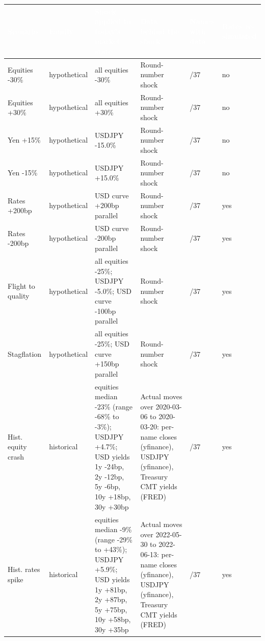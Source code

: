 \documentclass[11pt,letterpaper]{article}
\begin{document}
{\scriptsize\setlength{\LTpre}{4pt}\setlength{\LTpost}{6pt}
\begin{longtable}{>{\raggedright\arraybackslash}p{}>{\raggedright\arraybackslash}p{}>{\raggedright\arraybackslash}p{}>{\raggedright\arraybackslash}p{}>{\raggedright\arraybackslash}p{}>{\raggedright\arraybackslash}p{}}
\toprule
\rowcolor{navy}\textbf{\textcolor{white}{Scenario}} & \textbf{\textcolor{white}{Family}} & \textbf{\textcolor{white}{Shock applied to today's market state}} & \textbf{\textcolor{white}{Data behind the shock}} & \textbf{\textcolor{white}{Names with data}} & \textbf{\textcolor{white}{Rates re-simulated}} \\
\endhead
Equities -30\% & hypothetical & all equities -30\% & Round-number shock & 37/37 & no \\
\rowcolor{gray!9}Equities +30\% & hypothetical & all equities +30\% & Round-number shock & 37/37 & no \\
Yen +15\% & hypothetical & USDJPY -15.0\% & Round-number shock & 37/37 & no \\
\rowcolor{gray!9}Yen -15\% & hypothetical & USDJPY +15.0\% & Round-number shock & 37/37 & no \\
Rates +200bp & hypothetical & USD curve +200bp parallel & Round-number shock & 37/37 & yes \\
\rowcolor{gray!9}Rates -200bp & hypothetical & USD curve -200bp parallel & Round-number shock & 37/37 & yes \\
Flight to quality & hypothetical & all equities -25\%; USDJPY -5.0\%; USD curve -100bp parallel & Round-number shock & 37/37 & yes \\
\rowcolor{gray!9}Stagflation & hypothetical & all equities -25\%; USD curve +150bp parallel & Round-number shock & 37/37 & yes \\
Hist. equity crash & historical & equities median -23\% (range -68\% to -3\%); USDJPY +4.7\%; USD yields 1y -24bp, 2y -12bp, 5y -6bp, 10y +18bp, 30y +30bp & Actual moves over 2020-03-06 to 2020-03-20: per-name closes (yfinance), USDJPY (yfinance), Treasury CMT yields (FRED) & 37/37 & yes \\
\rowcolor{gray!9}Hist. rates spike & historical & equities median -9\% (range -29\% to +43\%); USDJPY +5.9\%; USD yields 1y +81bp, 2y +87bp, 5y +75bp, 10y +58bp, 30y +35bp & Actual moves over 2022-05-30 to 2022-06-13: per-name closes (yfinance), USDJPY (yfinance), Treasury CMT yields (FRED) & 37/37 & yes \\

\end{longtable}}
\end{document}
